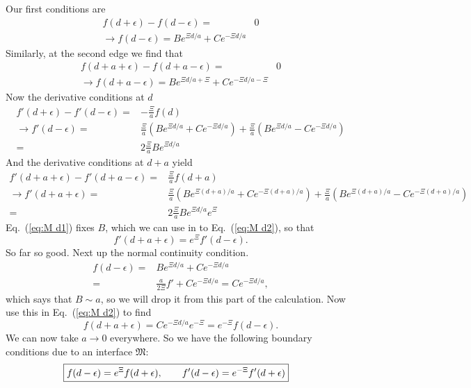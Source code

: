 Our first conditions are
\begin{align}
f(d+\epsilon) - f(d-\epsilon) =& 0\\
\rightarrow f(d-\epsilon) = Be^{\Xi d/a} + C e^{-\Xi d/a}\label{eq:M c1}
\end{align}
Similarly, at the second edge  we find that 
\begin{align}
f(d+a+\epsilon) - f(d+a-\epsilon) =& 0\\
\rightarrow f(d+a-\epsilon) = Be^{\Xi d/a+\Xi} + C e^{-\Xi d/a-\Xi}\label{eq:M c2}
\end{align}
Now the derivative conditions at $d$
\begin{align}
f'(d +\epsilon)-f'(d-\epsilon) =& -\frac{\Xi}{a}f(d)\\
\rightarrow f'(d-\epsilon)=& \frac{\Xi}{a}\left(Be^{\Xi d/a} + C e^{-\Xi d/a}\right) + \frac{\Xi}{a}\left(Be^{\Xi d/a} - C e^{-\Xi d/a}\right)\\
=& 2\frac{\Xi}{a}Be^{\Xi d/a} \label{eq:M d1}
\end{align}
And the derivative conditions at $d+a$ yield 
\begin{align}
f'(d+a+\epsilon) -f'(d+a-\epsilon)=& \frac{\Xi}{a}f(d+a)\\
\rightarrow f'(d+a+\epsilon)=&\frac{\Xi}{a}\left(Be^{\Xi (d+a)/a} + C e^{-\Xi (d+a)/a} \right)+ \frac{\Xi}{a}\left(Be^{\Xi (d+a)/a} - C e^{-\Xi (d+a)/a} \right)\\
=&2\frac{\Xi}{a}Be^{\Xi d/a}e^{\Xi}\label{eq:M d2}
\end{align}
Eq.~(\ref{eq:M d1}) fixes $B$, which we can use in to Eq.~(\ref{eq:M d2}), so that 
\begin{equation}
f'(d+a+\epsilon) = e^{\Xi}f'(d-\epsilon).
\end{equation}
So far so good.  Next up the normal continuity condition.  
\begin{align}
f(d-\epsilon) =& B e^{\Xi d/a} + C e^{-\Xi d/a}\\
=& \frac{a}{2\Xi} f' + C e^{-\Xi d/a} = C e^{-\Xi d/a},
\end{align}
which says that $B\sim a$, so we will drop it from this part of the calculation.  
Now use this in Eq.~(\ref{eq:M d2}) to find
\begin{equation}
f(d+a+\epsilon) = C e^{-\Xi d/a} e^{-\Xi} =  e^{-\Xi} f(d-\epsilon).  
\end{equation}
We can now take $a\rightarrow 0 $ everywhere.  So we have the following boundary conditions due to an interface $\mathfrak{M}$:
\begin{align}
\Aboxed{
f(d-\epsilon) =& e^{\Xi}f(d+\epsilon), \qquad
f'(d -\epsilon)= e^{-\Xi}f'(d+\epsilon)
}
\end{align}
\label{sec:TM boundary condition}
